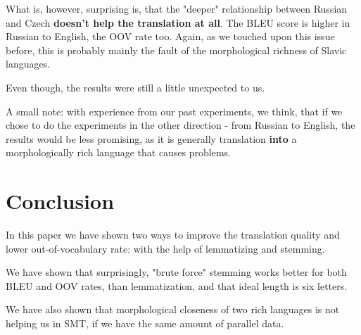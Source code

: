 \documentclass[11pt,letterpaper]{article}
\begin{document}
What is, however, surprising is, that the "deeper" relationship between Russian and Czech \textbf{doesn't help the translation at all}. The BLEU score is higher in Russian to English, the OOV rate too. Again, as we touched upon this issue before, this is probably mainly the fault of the morphological richness of Slavic languages. 

Even though, the results were still a little unexpected to us. 

A small note: with experience from our past experiments, we think, that if we chose to do the experiments in the other direction - from Russian to English, the results would be less promising, as it is generally translation \textbf{into} 
a morphologically rich language that causes problems.

\section{Conclusion}
In this paper we have shown two ways to improve the translation quality and lower out-of-vocabulary rate: with the help of lemmatizing and stemming. 


We have shown that surprisingly, "brute force" stemming works better for both BLEU and OOV rates, than lemmatization, and that ideal length is six letters. 

We have also shown that morphological closeness of two rich languages is not helping us in SMT, if we have the same amount of parallel data.




\end{document}
